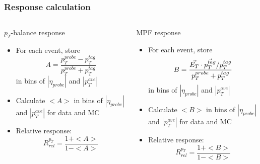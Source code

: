 \documentclass[t,compress]{beamer}
\begin{document}
\begin{frame}
 \frametitle{Response calculation}
 \vspace{-1cm}
 \begin{columns}[t]
\begin{column}{.5\textwidth}
\begin{block}{$p_T$-balance response}
\begin{itemize}
\item For each event, store \newline
      \begin{equation}
            A = \frac{p_T^{probe} - p_T^{tag}}{p_T^{probe} + p_T^{tag}}
      \end{equation}
      in bins of $|\eta_{probe}|$ and $|p_T^{ave}|$
\item Calculate $<A>$ in bins of $|\eta_{probe}|$ and $|p_T^{ave}|$ for data and MC
\item Relative response: \newline
\begin{equation}
R_{rel}^{p_T} = \frac{1 + <A>}{1 - <A>}
\end{equation}
\end{itemize}
\end{block}
\end{column}
\begin{column}{.5\textwidth}
\begin{alertblock}{MPF response}
\begin{itemize}
\item For each event, store \newline
      \begin{equation}
            B = \frac{\vec{E_T} \cdot \vec{p_T^{tag}} /p_T^{tag}}{p_T^{probe} + p_T^{tag}} \newline
      \end{equation}
      in bins of $|\eta_{probe}|$ and $|p_T^{ave}|$
\item Calculate $<B>$ in bins of $|\eta_{probe}|$ and $|p_T^{ave}|$ for data and MC
\item Relative response:\newline
\begin{equation}
R_{rel}^{p_T} = \frac{1 + <B>}{1 - <B>} 
\end{equation}

\end{itemize}
\end{alertblock}
\end{column}
\end{columns}
\end{frame}
\end{document}
